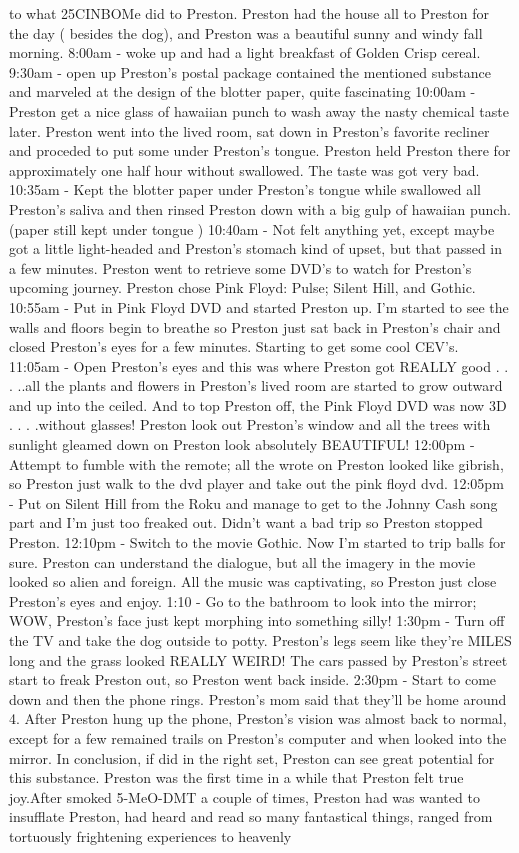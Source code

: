 \documentclass[12pt]{book}
\begin{document}
to what 25CINBOMe did to Preston. Preston had the house all to Preston for the day ( besides the dog), and Preston was a beautiful sunny and windy fall morning. 8:00am - woke up and had a light breakfast of Golden Crisp cereal. 9:30am - open up Preston's postal package contained the mentioned substance and marveled at the design of the blotter paper, quite fascinating 10:00am - Preston get a nice glass of hawaiian punch to wash away the nasty chemical taste later. Preston went into the lived room, sat down in Preston's favorite recliner and proceded to put some under Preston's tongue. Preston held Preston there for approximately one half hour without swallowed. The taste was got very bad. 10:35am - Kept the blotter paper under Preston's tongue while swallowed all Preston's saliva and then rinsed Preston down with a big gulp of hawaiian punch.(paper still kept under tongue ) 10:40am - Not felt anything yet, except maybe got a little light-headed and Preston's stomach kind of upset, but that passed in a few minutes. Preston went to retrieve some DVD's to watch for Preston's upcoming journey. Preston chose Pink Floyd: Pulse; Silent Hill, and Gothic. 10:55am - Put in Pink Floyd DVD and started Preston up. I'm started to see the walls and floors begin to breathe so Preston just sat back in Preston's chair and closed Preston's eyes for a few minutes. Starting to get some cool CEV's. 11:05am - Open Preston's eyes and this was where Preston got REALLY good . . .  ..all the plants and flowers in Preston's lived room are started to grow outward and up into the ceiled. And to top Preston off, the Pink Floyd DVD was now 3D . . .  .without glasses! Preston look out Preston's window and all the trees with sunlight gleamed down on Preston look absolutely BEAUTIFUL! 12:00pm - Attempt to fumble with the remote; all the wrote on Preston looked like gibrish, so Preston just walk to the dvd player and take out the pink floyd dvd. 12:05pm - Put on Silent Hill from the Roku and manage to get to the Johnny Cash song part and I'm just too freaked out. Didn't want a bad trip so Preston stopped Preston. 12:10pm - Switch to the movie Gothic. Now I'm started to trip balls for sure. Preston can understand the dialogue, but all the imagery in the movie looked so alien and foreign. All the music was captivating, so Preston just close Preston's eyes and enjoy. 1:10 - Go to the bathroom to look into the mirror; WOW, Preston's face just kept morphing into something silly! 1:30pm - Turn off the TV and take the dog outside to potty. Preston's legs seem like they're MILES long and the grass looked REALLY WEIRD! The cars passed by Preston's street start to freak Preston out, so Preston went back inside. 2:30pm - Start to come down and then the phone rings. Preston's mom said that they'll be home around 4. After Preston hung up the phone, Preston's vision was almost back to normal, except for a few remained trails on Preston's computer and when looked into the mirror. In conclusion, if did in the right set, Preston can see great potential for this substance. Preston was the first time in a while that Preston felt true joy.After smoked 5-MeO-DMT a couple of times, Preston had was wanted to insufflate Preston, had heard and read so many fantastical things, ranged from tortuously frightening experiences to heavenly 
\end{document}

